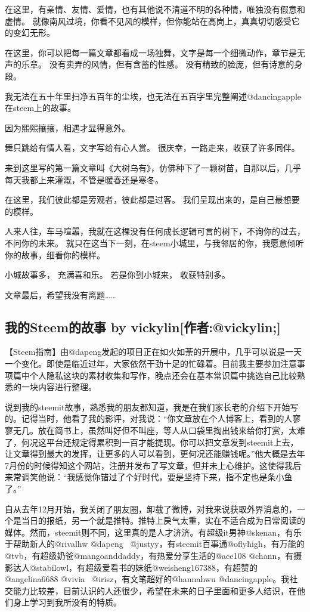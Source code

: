\documentclass[]{ctexbook}
\begin{document}
在这里，有亲情、友情、爱情，也有其他说不清道不明的各种情，唯独没有假意和虚情。
就像南风过境，你看不见风的模样，但你能站在高岗上，真真切切感受它的变幻无形。

在这里，你可以把每一篇文章都看成一场独舞，文字是每一个细微动作，章节是无声的乐章。
没有卖弄的风情，但有含蓄的性感。
没有精致的脸庞，但有诗意的身段。

我无法在五十年里扫净五百年的尘埃，也无法在五百字里完整阐述@dancingapple在steem上的故事。

因为熙熙攘攘，相遇才显得意外。

舞只跳给有情人看，文字写给有心人赏。
很庆幸，一路走来，收获了许多同伴。

来到这里写的第一篇文章叫《大树乌有》，仿佛种下了一颗树苗，自那以后，几乎每天我都上来灌溉，不管是暖春还是寒冬。

在这里，我们彼此都是旁观者，彼此都是过客。
我们呈现出来的，是自己最想要的模样。

人来人往，车马喧嚣，我就在这棵没有任何成长逻辑可言的树下，不询你的过去，不问你的未来。
就只在这当下一刻，在steem小城里，与我邻居的你，我愿意倾听你的故事，细看你的模样。

小城故事多，
充满喜和乐。
若是你到小城来，
收获特别多。

文章最后，希望我没有离题\ldots{}\ldots{}

\hypertarget{steem-by-vickylinvickylin}{%
\subsection{我的Steem的故事 by vickylin{[}作者:@vickylin;{]}}\label{steem-by-vickylinvickylin}}

【Steem指南】由@dapeng发起的项目正在如火如荼的开展中，几乎可以说是一天一个变化。即使是临近过年，大家依然干劲十足的忙碌着。目前我主要参加注意事项篇中个人隐私这块的素材收集和写作，晚点还会在基本常识篇中挑选自己比较熟悉的一块内容进行整理。

说到我的steemit故事，熟悉我的朋友都知道，我是在我们家长老的介绍下开始写的。记得当时，他看了我的影评，对我说：``你文章放在个人博客上，看到的人寥寥无几。放在简书上，虽然叫好但不叫座，等人从口袋里掏出钱来给你打赏，太难了，何况这平台还规定得累积到一百才能提现。你可以把文章发到steemit上去，让文章得到最大的发挥，让更多的人可以看到，更何况还能赚钱呢。''他大概是去年7月份的时候得知这个网站，注册并发布了写文章，但并未上心维护。这使得我后来常调笑他说：``我感觉你错过了个好时代，要是坚持下来，指不定也是条小鱼了。''

自从去年12月开始，我关闭了朋友圈，卸载了微博，对我来说获取外界消息的，一个是当日的报纸，另一个就是推特。推特上戾气太重，实在不适合成为日常阅读的媒体。然而，steemit则不同，这里真的是人才济济。有超级it男神@skenan，有乐于帮助新人的@rivalhw @dapeng~ @justyy，有steemit百事通@oflyhigh，有万能的@tvb，有超级奶爸@mangoanddaddy，有热爱分享生活的@ace108 @chann，有摄影达人@stabilowl，有超级爱看书的妹纸@weisheng167388，有超赞的@angelina6688 @vivia~ @irisz，有文笔超好的@hannahwu @dancingapple。我社交能力比较差，目前认识的人还很少，希望在未来的日子里面和更多人结识，在他们身上学习到我所没有的特质。
\end{document}
